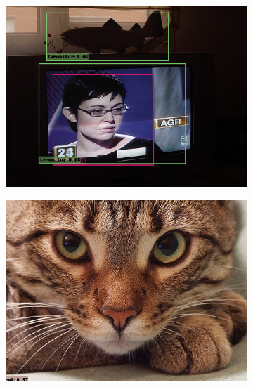 \clearpage
\begin{figure}[h!]
    \centering
    \begin{subfigure}[b]{0.54\textwidth}
        \centering
        \includegraphics[width=\textwidth]{Images/voc_output/000342.png}
    \end{subfigure}
    \hfill
    \begin{subfigure}[b]{0.54\textwidth}
        \centering
        \includegraphics[width=\textwidth]{Images/voc_output/000542.png}
    \end{subfigure}
    \hfill
    \begin{subfigure}[b]{0.54\textwidth}
        \centering

\end{subfigure}
\end{figure}
